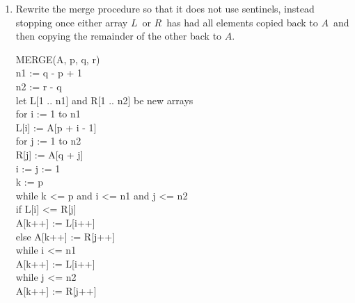\documentclass{article}
\newcommand{\?}{\stackrel{?}{=}}
\newcommand\Ans[2][]{%
   \leavevmode\noindent
   {
       \begin{mdframed}[backgroundcolor=blue!10]
       #2
       \end{mdframed}
   }
}
\begin{document}
\begin{enumerate}
{ ~ Initial unsorted array
	}
	\item Rewrite the merge procedure so that it does not use sentinels, instead stopping once either array $L$\ or $R$\ has had all elements copied back to $A$\ and then copying the remainder of the other back to $A$.
	\Ans{
	    \setlength{\parindent}{5ex}
	    \begin{tt}
	    	MERGE(A, p, q, r) \\
	    	\indent n1 := q - p + 1 \\
	    	\indent n2 := r - q \\
	    	\indent let L[1 .. n1] and R[1 .. n2] be new arrays \\
	    	\indent for i := 1 to n1 \\
	    	\indent \indent L[i] := A[p + i - 1] \\
	    	\indent for j := 1 to n2 \\
	    	\indent \indent R[j] := A[q + j] \\
	    	\indent i := j := 1 \\
	    	\indent k := p \\
	    	\indent while k <= p and i <= n1 and j <= n2 \\
	    	\indent \indent if L[i] <= R[j] \\
	    	\indent \indent \indent A[k++] := L[i++] \\
	    	\indent \indent else A[k++] := R[j++] \\
	    	\indent while i <= n1 \\
	    	\indent \indent A[k++] := L[i++] \\
	    	\indent while j <= n2 \\
	    	\indent \indent A[k++] := R[j++] \\
	    \end{tt}
	    	
}
\end{enumerate}
\end{document}

